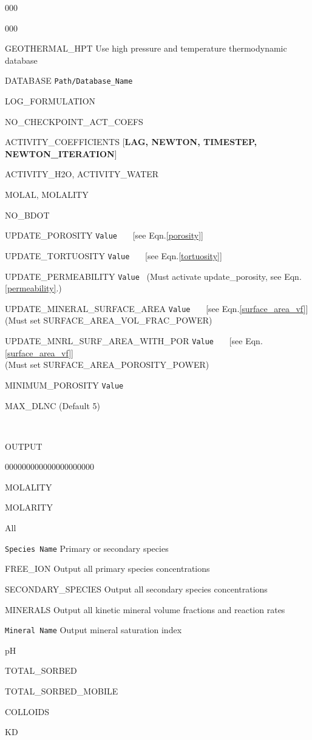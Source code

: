 \documentclass[12pt]{article}
\begin{document}
\begin{deflist}{000}
\begin{deflist}{000}
\item[GEOTHERMAL\_HPT] Use high pressure and temperature thermodynamic database
\item[DATABASE] {\tt Path/Database\_Name}
\item[LOG\_FORMULATION]
\item[NO\_CHECKPOINT\_ACT\_COEFS]
\item[ACTIVITY\_COEFFICIENTS] [{\bf LAG, NEWTON, TIMESTEP, NEWTON\_ITERATION}]
\item[ACTIVITY\_H2O, ACTIVITY\_WATER]
\item[MOLAL, MOLALITY]
\item[NO\_BDOT]
\item[UPDATE\_POROSITY] {\tt Value} \ \ \ [see Eqn.\eqref{porosity}]
\item[UPDATE\_TORTUOSITY] {\tt Value} \ \ \ [see Eqn.\eqref{tortuosity}]
\item[UPDATE\_PERMEABILITY] {\tt Value} \ (Must activate update\_porosity, see Eqn.\eqref{permeability}.)
\item[UPDATE\_MINERAL\_SURFACE\_AREA] {\tt Value} \ \ \ [see Eqn.\eqref{surface_area_vf}]\\
(Must set SURFACE\_AREA\_VOL\_FRAC\_POWER)
\item[UPDATE\_MNRL\_SURF\_AREA\_WITH\_POR] {\tt Value} \ \ \ [see Eqn.\eqref{surface_area_vf}]\\
(Must set SURFACE\_AREA\_POROSITY\_POWER)
\item[MINIMUM\_POROSITY] {\tt Value}
\item[MAX\_DLNC] \rm (Default 5)

~\\

\item[OUTPUT] ~
\begin{deflist}{000000000000000000000}
\item[MOLALITY]
\item[MOLARITY]
\item[All]
\item[\tt Species Name] Primary or secondary species
\item[FREE\_ION] Output all primary species concentrations
\item[SECONDARY\_SPECIES] Output all secondary species concentrations
\item[MINERALS] Output all kinetic mineral volume fractions and reaction rates
\item[\tt Mineral Name] Output mineral saturation index
\item[pH]
\item[TOTAL\_SORBED]
\item[TOTAL\_SORBED\_MOBILE]
\item[COLLOIDS]
\item[KD]
\end{deflist}


\end{deflist}
\end{deflist}
\end{document}
